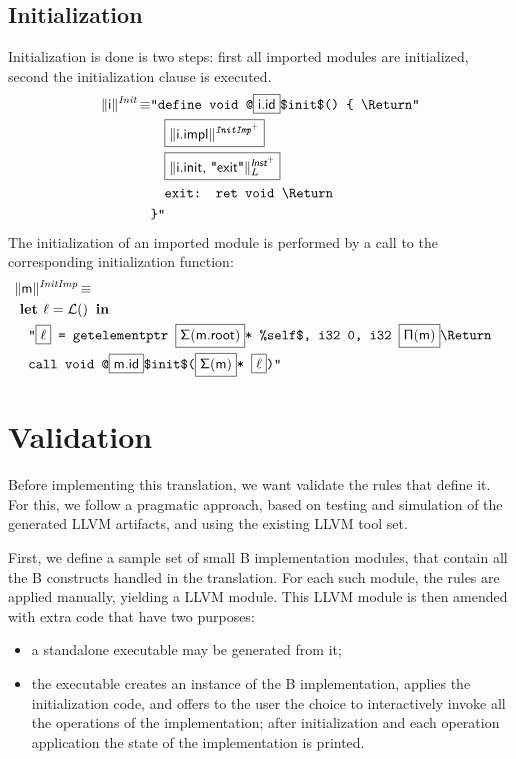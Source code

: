 \documentclass{llncs}
\newcommand{\trad}[2]{\ensuremath{\lVert \textsf{#1} \rVert^{\textit{#2}}}}
\newcommand{\nl}[0]{\text{\Return}}
\DeclareMathOperator{\isdef}{\equiv}
\DeclareMathOperator{\lbl}{\mathcal{L}()}
\newcommand{\llvm}[1]{\texttt{#1}}
\newcommand{\B}[1]{\textsf{#1}}
\newcommand{\ListOf}[1]{$\mbox{#1}^+$}
\newcommand{\LET}[0]{\textbf{ let }}
\newcommand{\IN}[0]{\textbf{ in }}
\newcommand{\PH}[1]{\framebox{$#1$}}
\newcommand{\idx}[0]{\ensuremath{\sf\Pi}}
\newcommand{\state}[0]{\ensuremath{\sf\Sigma}}
\begin{document}
\subsection{Initialization}
\label{sec:trad-init}

Initialization is done is two steps: first all imported modules are initialized,
second the initialization clause is executed.
\begin{align*}
  \trad{i}{Init} \isdef
  & \llvm{"define void @\PH{\B{i.id}}\$init\$() \{ \nl"} \\
  & \quad\llvm{\PH{\trad{i.impl}{\ListOf{InitImp}}}} \\
  & \quad\llvm{\PH{\trad{i.init, "exit"}{\ListOf{\B{Inst}}}_L}} \\
  & \quad\llvm{exit: ret void \nl} \\
  & \llvm{\}"}
\end{align*}
The initialization of an imported module is performed by a call to the
corresponding initialization function:
\begin{align*}
  \lefteqn{\trad{m}{InitImp} \isdef } \\
  & \LET \ell = \lbl \IN \\
  & \quad \llvm{"\PH{\ell} = getelementptr \PH{\state(\B{m.root})}* \%self\$, i32 0, i32 \PH{\idx(\B{m})}\nl}\\
  & \quad \llvm{call void @\PH{\B{m.id}}\$init\$(\PH{\state(\B{m})}*
    \PH{\ell})"}
\end{align*}

\section{Validation}
\label{sec:validation}

Before implementing this translation, we want validate the rules that define it.
For this, we follow a pragmatic approach, based on testing and simulation of the
generated LLVM artifacts, and using the existing LLVM tool set.  

First, we define a sample set of small B implementation modules, that contain
all the B constructs handled in the translation. For each such module, the rules
are applied manually, yielding a LLVM module. This LLVM module is then amended
with extra code that have two purposes:
\begin{itemize}
\item a standalone executable may be generated from it;
\item the executable creates an instance of the B implementation, applies the
  initialization code, and offers to the user the choice to interactively invoke
  all the operations of the implementation; after initialization and each
  operation application the state of the implementation is printed. 
\end{itemize}
\end{document}
